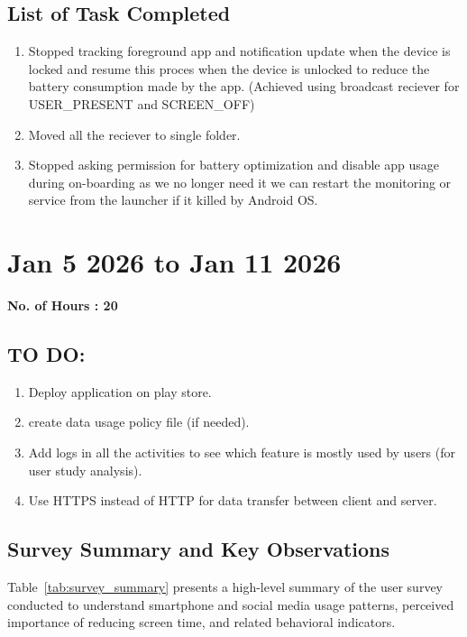\documentclass[12pt]{article}
\begin{document}
\begin{enumerate}
\begin{enumerate}
    \subsection{List of Task Completed}
    \begin{enumerate}
        \item Stopped tracking foreground app and notification update when the device is locked and resume this proces when the device is unlocked to reduce the battery consumption made by the app. (Achieved using broadcast reciever for USER\_PRESENT and SCREEN\_OFF)
        \item Moved all the reciever to single folder.
        \item Stopped asking permission for battery optimization and disable app usage during on-boarding as we no longer need it we can restart the monitoring or service from the launcher if it killed by Android OS.
    \end{enumerate}
    \end{enumerate}
    \section{Jan 5 2026 to Jan 11 2026}
    {\bf No. of Hours : 20}
    \subsection{TO DO: }
    \begin{enumerate}
        \item Deploy application on play store.
        \item create data usage policy file (if needed). 
        \item Add logs in all the activities to see which feature is mostly used by users (for user study analysis).
        \item Use HTTPS instead of HTTP for data transfer between client and server.
    \end{enumerate}
    \subsection{Survey Summary and Key Observations}
    
    Table~\ref{tab:survey_summary} presents a high-level summary of the user survey conducted to understand smartphone and social media usage patterns, perceived importance of reducing screen time, and related behavioral indicators.
    

\end{enumerate}
\end{document}
